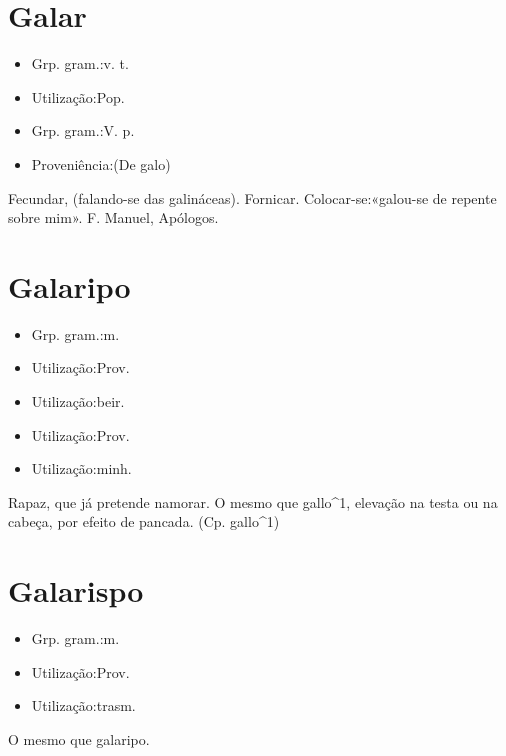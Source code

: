 \section{Galar}
\begin{itemize}
\item {Grp. gram.:v. t.}
\end{itemize}
\begin{itemize}
\item {Utilização:Pop.}
\end{itemize}
\begin{itemize}
\item {Grp. gram.:V. p.}
\end{itemize}
\begin{itemize}
\item {Proveniência:(De \textunderscore galo\textunderscore )}
\end{itemize}
Fecundar, (falando-se das galináceas).
Fornicar.
Colocar-se:«\textunderscore galou-se de repente sobre mim\textunderscore ». F. Manuel, \textunderscore Apólogos\textunderscore .
\section{Galaripo}
\begin{itemize}
\item {Grp. gram.:m.}
\end{itemize}
\begin{itemize}
\item {Utilização:Prov.}
\end{itemize}
\begin{itemize}
\item {Utilização:beir.}
\end{itemize}
\begin{itemize}
\item {Utilização:Prov.}
\end{itemize}
\begin{itemize}
\item {Utilização:minh.}
\end{itemize}
Rapaz, que já pretende namorar.
O mesmo que \textunderscore gallo\textunderscore ^1, elevação na testa ou na cabeça, por efeito de pancada.
(Cp. \textunderscore gallo\textunderscore ^1)
\section{Galarispo}
\begin{itemize}
\item {Grp. gram.:m.}
\end{itemize}
\begin{itemize}
\item {Utilização:Prov.}
\end{itemize}
\begin{itemize}
\item {Utilização:trasm.}
\end{itemize}
O mesmo que \textunderscore galaripo\textunderscore .
